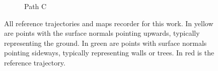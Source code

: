 \begin{figure}[htpb]
\begin{center}
\begin{subfigure}[b]{0.32\textwidth}
			\label{fig:ltr_c}
			\caption{Path C}
		\end{subfigure}%
		\caption{All reference trajectories and maps recorder for this work.
		In yellow are points with the surface normals pointing upwards, typically representing the ground.
		In green are points with surface normals pointing sideways, typically representing walls or trees.
		In red is the reference trajectory.} 
		\label{fig:forest}
	\end{center}
\end{figure}



\lightlipsum[1]